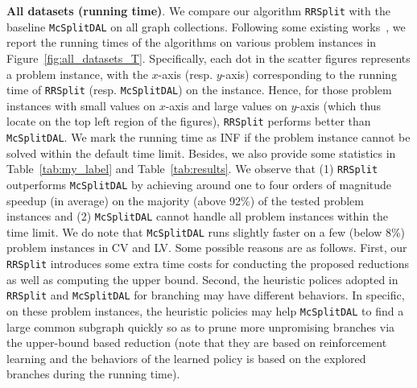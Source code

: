 \noindent\textbf{All datasets (running time)}. We compare our algorithm \texttt{RRSplit} with the baseline \texttt{McSplitDAL} on all graph collections. {\YuiR Following some existing works~\cite{mccreesh2016clique}}, we report the running times of the algorithms on various problem instances in Figure~\ref{fig:all_datasets_T}. 
%
%
Specifically, each dot in the scatter figures represents a problem instance, with the $x$-axis (resp. $y$-axis) corresponding to the running time of \texttt{RRSplit} (resp. \texttt{McSplitDAL}) {\chengC on the instance}. Hence, for those problem instances with small values on $x$-axis and large values on $y$-axis (which thus locate on the top left region of the figures), \texttt{RRSplit} performs better than \texttt{McSplitDAL}.
We mark the running time as INF if the problem instance cannot be solved within the default time limit.
%
{\YuiR Besides, we also provide some statistics in Table~\ref{tab:my_label} and Table~\ref{tab:results}.}
%
We observe that (1) \texttt{RRSplit} outperforms \texttt{McSplitDAL} by achieving around one to {\Yui four} orders of magnitude speedup {\YuiR (in average)} on the majority {\YuiR (above 92\%)} of the tested problem instances and (2) \texttt{McSplitDAL} cannot handle all problem instances within the time limit. 
We do note that \texttt{McSplitDAL} runs slightly faster on a few {\YuiR (below 8\%)} problem instances in \textsf{CV} and \textsf{LV}. {\YuiR Some possible reasons are as follows. 
First, our \texttt{RRSplit} introduces some extra time costs for conducting the proposed reductions as well as computing the upper bound. Second, the heuristic polices adopted in \texttt{RRSplit} and \texttt{McSplitDAL} for branching may have different behaviors. 
%
In specific, on these problem instances, the heuristic policies may help \texttt{McSplitDAL} to find a large common subgraph quickly so as to prune more unpromising branches {\revision via the upper-bound based reduction} (note that they are based on reinforcement learning {\cheng and the behaviors of the learned policy is} based on the explored branches during the running time). } 



